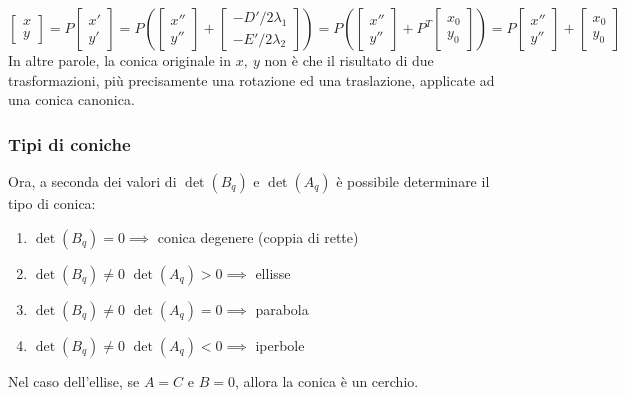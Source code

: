        \[
            \begin{bmatrix} x \\ y \end{bmatrix} = P \begin{bmatrix} x' \\ y' \end{bmatrix} = P \left( \begin{bmatrix} x'' \\ y'' \end{bmatrix} + \begin{bmatrix} - D' / 2 \lambda_1 \\ - E' / 2 \lambda_2 \end{bmatrix} \right) = P \left( \begin{bmatrix} x'' \\ y'' \end{bmatrix} + P^{T} \begin{bmatrix} x_0 \\ y_0 \end{bmatrix} \right) = P \begin{bmatrix} x'' \\ y'' \end{bmatrix} + \begin{bmatrix} x_0 \\ y_0 \end{bmatrix}
        \]
        In altre parole, la conica originale in $x, \: y$ non è che il risultato di due trasformazioni, più precisamente una rotazione ed una traslazione, applicate ad una conica canonica.

    \vspace{10pt}
    \subsubsection{Tipi di coniche} \label{subsubsec:quadformconictypes}
        Ora, a seconda dei valori di $\det(B_q)$ e $\det(A_q)$ è possibile determinare il tipo di conica:
        \begin{enumerate}[label=(\arabic*)]
            \item  $\det(B_q) = 0 \implies$ conica degenere (coppia di rette)
            \item $\det(B_q) \neq 0$  $\det(A_q) > 0 \implies$  ellisse
            \item $\det(B_q) \neq 0$  $\det(A_q) = 0 \implies$  parabola
            \item $\det(B_q) \neq 0$  $\det(A_q) < 0 \implies$  iperbole
        \end{enumerate}
        Nel caso dell'ellise, se $A = C$ e $B = 0$, allora la conica è un cerchio.
